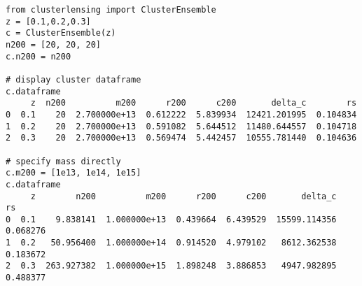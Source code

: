\documentclass[twocolumn]{aastex6}
\begin{document}
\begin{lstlisting}
from clusterlensing import ClusterEnsemble
z = [0.1,0.2,0.3]
c = ClusterEnsemble(z)
n200 = [20, 20, 20]
c.n200 = n200

# display cluster dataframe
c.dataframe
     z  n200          m200      r200      c200       delta_c        rs
0  0.1    20  2.700000e+13  0.612222  5.839934  12421.201995  0.104834
1  0.2    20  2.700000e+13  0.591082  5.644512  11480.644557  0.104718
2  0.3    20  2.700000e+13  0.569474  5.442457  10555.781440  0.104636

# specify mass directly
c.m200 = [1e13, 1e14, 1e15]
c.dataframe
     z        n200          m200      r200      c200       delta_c        rs
0  0.1    9.838141  1.000000e+13  0.439664  6.439529  15599.114356  0.068276
1  0.2   50.956400  1.000000e+14  0.914520  4.979102   8612.362538  0.183672
2  0.3  263.927382  1.000000e+15  1.898248  3.886853   4947.982895  0.488377
\end{lstlisting}
\end{document}
